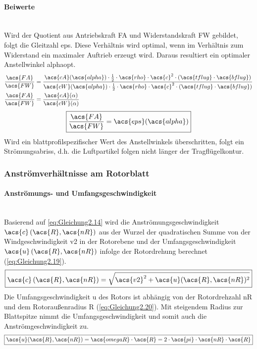 \paragraph{Beiwerte}\mbox{}\smallskip\\
Wird der Quotient aus Antriebskraft \acs{FA} und Widerstandskraft \acs{FW} gebildet, folgt die Gleitzahl \acs{eps}. Diese Verhältnis wird optimal, wenn im Verhältnis zum Widerstand ein maximaler Auftrieb erzeugt wird. Daraus resultiert ein optimaler Anstellwinkel \acs{alphaopt}.
\begin{align}
    \frac{\acs{FA}}{\acs{FW}} &= \frac{\acs{cA}(\acs{alpha}) \cdot \frac{1}{2} \cdot \acs{rho} \cdot \acs{c}^2 \cdot (\acs{tflug} \cdot \acs{bflug})}{\acs{cW}(\acs{alpha}) \cdot \frac{1}{2} \cdot \acs{rho} \cdot \acs{c}^2 \cdot (\acs{tflug} \cdot \acs{bflug})} \nonumber \\
    \frac{\acs{FA}}{\acs{FW}} &= \frac{\acs{cA}(\alpha)}{\acs{cW}(\alpha)} \label{eq:Gleichung2.17}
\end{align}
\begin{equation} \label{eq:Gleichung2.18}
    \boxed{\frac{\acs{FA}}{\acs{FW}} = \acs{eps}(\acs{alpha})}
\end{equation}
Wird ein blattprofilspezifischer Wert des Anstellwinkels überschritten, folgt ein Strömungsabriss, d.h. die Luftpartikel folgen nicht länger der Tragflügelkontur.

\subsubsection{Anströmverhältnisse am Rotorblatt}

\paragraph{Anströmungs- und Umfangsgeschwindigkeit}\mbox{}\smallskip\\
Basierend auf \autoref{eq:Gleichung2.14} wird die Anströmungsgeschwindigkeit $\acs{c}\left(\acs{R}, \acs{nR}\right)$ aus der Wurzel der quadratischen Summe von der Windgeschwindigkeit \acs{v2} in der Rotorebene und der Umfangsgeschwindigkeit $\acs{u}\left(\acs{R}, \acs{nR}\right)$ infolge der Rotordrehung berechnet (\autoref{eq:Gleichung2.19}).
\begin{equation} \label{eq:Gleichung2.19}
    \boxed{\acs{c}\left(\acs{R}, \acs{nR}\right) = \sqrt{\acs{v2}^2 + \acs{u}(\acs{R}, \acs{nR})^2}}
\end{equation}
\newline
Die Umfangsgeschwindigkeit \acs{u} des Rotors ist abhängig von der Rotordrehzahl \acs{nR} und dem Rotoraußenradius \acs{R} (\autoref{eq:Gleichung2.20}). Mit steigendem Radius zur Blattspitze nimmt die Umfangsgeschwindigkeit und somit auch die Anströmgeschwindigkeit zu.
\begin{equation} \label{eq:Gleichung2.20}
    \boxed{\acs{u}(\acs{R}, \acs{nR}) = \acs{omegaR} \cdot \acs{R} = 2 \cdot \acs{pi} \cdot \acs{nR} \cdot \acs{R}}
\end{equation}

